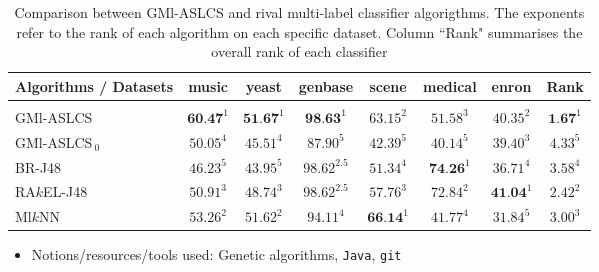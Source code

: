 \begin{table}[!h]
  \begin{center}
    \begin{tabular}{l|cccccc|c}
    Algorithms / Datasets& music     & yeast     & genbase       & scene     & medical   & enron     & Rank \\
    \toprule \\ [-2ex]
    GMl-ASLCS         & $\textbf{60.47}^1$ & $\textbf{51.67}^1$ & $\textbf{98.63}^1$  & $63.15^2$ & $51.58^3$ & $40.35^2$ & $\textbf{1.67}^1$ \\
    GMl-ASLCS$_{\:0}$ & $50.05^4$ & $45.51^4$ & $87.90^5$     & $42.39^5$ & $40.14^5$ & $39.40^3$ & $4.33^5$                                  \\
    BR-J48            & $46.23^5$ & $43.95^5$ & $98.62^{2.5}$ & $51.34^4$ & $\textbf{74.26}^1$ & $36.71^4$ & $3.58^4$                         \\
    RA$k$EL-J48       & $50.91^3$ & $48.74^3$ & $98.62^{2.5}$ & $57.76^3$ & $72.84^2$ & $\textbf{41.04}^1$ & $2.42^2$                         \\
    Ml$k$NN           & $53.26^2$ & $51.62^2$ & $94.11^4$     & $\textbf{66.14}^1$ & $41.77^4$ & $31.84^5$ & $3.00^3$                         \\ \bottomrule
    \end{tabular}
    \caption{\small Comparison between GMl-ASLCS and rival multi-label
             classifier algorigthms.  The exponents refer to the rank of each
             algorithm on each specific dataset.  Column ``Rank" summarises the
             overall rank of each classifier}
	\label{table:accuracyBasedComparison}
    \end{center}
\end{table}

\begin{itemize}
  \item Notions/resources/tools used: Genetic algorithms, \texttt{Java}, \texttt{git}
\end{itemize}
